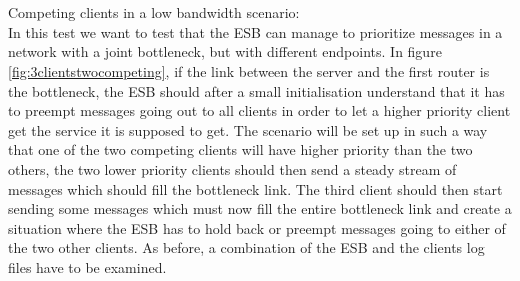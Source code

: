 \\\\
Competing clients in a low bandwidth scenario:\\
    In this test we want to test that the ESB can manage to prioritize messages in a network with a joint bottleneck, but with different endpoints. In figure \ref{fig:3clientstwocompeting}, if the link between the server and the first router is the bottleneck, the ESB should after a small initialisation understand that it has to preempt messages going out to all clients in order to let a higher priority client get the service it is supposed to get. The scenario will be set up in such a way that one of the two competing clients will have higher priority than the two others, the two lower priority clients should then send a steady stream of messages which should fill the bottleneck link. The third client should then start sending some messages which must now fill the entire bottleneck link and create a situation where the ESB has to hold back or preempt messages going to either of the two other clients. As before, a combination of the ESB and the clients log files have to be examined.
